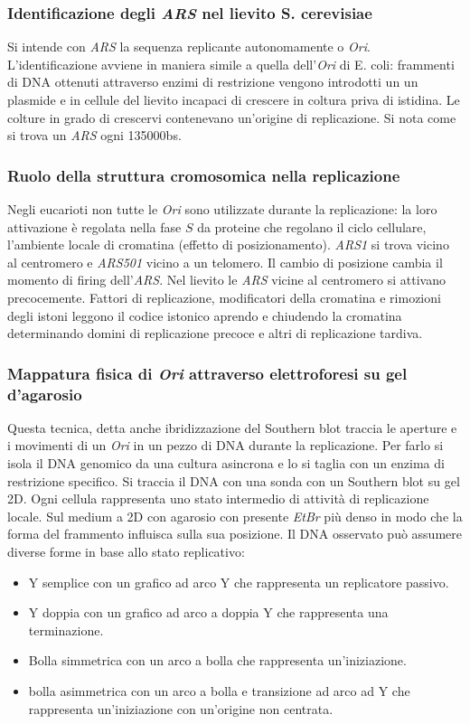 \subsubsection{Identificazione degli \emph{ARS} nel lievito S. cerevisiae}
Si intende con \emph{ARS} la sequenza replicante autonomamente o \emph{Ori}. L'identificazione avviene in maniera simile a quella dell'\emph{Ori} di E. coli: frammenti di DNA ottenuti
attraverso enzimi di restrizione vengono introdotti un un plasmide e in cellule del lievito incapaci di crescere in coltura priva di istidina. Le colture in grado di crescervi 
contenevano un'origine di replicazione. Si nota come si trova un \emph{ARS} ogni \num{135000}\si{bs}. 
\subsubsection{Ruolo della struttura cromosomica nella replicazione}
Negli eucarioti non tutte le \emph{Ori} sono utilizzate durante la replicazione: la loro attivazione \`e regolata nella fase $S$ da proteine che regolano il ciclo cellulare, 
l'ambiente locale di cromatina (effetto di posizionamento). \emph{ARS1} si trova vicino al centromero e \emph{ARS501} vicino a un telomero. Il cambio di posizione cambia il momento
di firing dell'\emph{ARS}. Nel lievito le \emph{ARS} vicine al centromero si attivano precocemente. Fattori di replicazione, modificatori della cromatina e rimozioni degli istoni
leggono il codice istonico aprendo e chiudendo la cromatina determinando domini di replicazione precoce e altri di replicazione tardiva. 
\subsubsection{Mappatura fisica di \emph{Ori} attraverso elettroforesi su gel d'agarosio}
Questa tecnica, detta anche ibridizzazione del Southern blot traccia le aperture e i movimenti di un \emph{Ori} in un pezzo di DNA durante la replicazione. Per farlo si isola il 
DNA genomico da una cultura asincrona e lo si taglia con un enzima di restrizione specifico. Si traccia il DNA con una sonda con un Southern blot su gel 2D. Ogni cellula 
rappresenta uno stato intermedio di attivit\`a di replicazione locale. Sul medium a 2D con agarosio con presente \emph{EtBr} pi\`u denso in modo che la forma del frammento influisca 
sulla sua posizione. Il DNA osservato pu\`o assumere diverse forme in base allo stato replicativo: 
\begin{itemize}
	\item Y semplice con un grafico ad arco Y che rappresenta un replicatore passivo.
	\item Y doppia con un grafico ad arco a doppia Y che rappresenta una terminazione.
	\item Bolla simmetrica con un arco a bolla che rappresenta un'iniziazione. 
	\item bolla asimmetrica con un arco a bolla e transizione ad arco ad Y che rappresenta un'iniziazione con un'origine non centrata.
\end{itemize}
